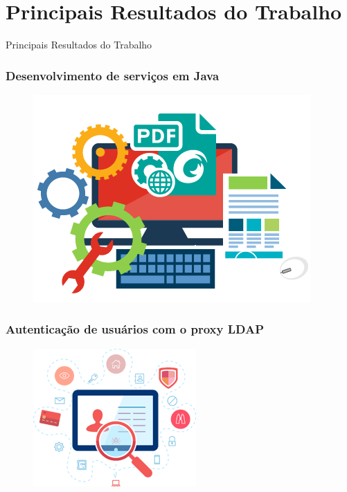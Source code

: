 \documentclass{beamer}
\begin{document}
\section{Principais Resultados do Trabalho}


\begin{frame}[c]{ }
\centering
  \huge{Principais Resultados do Trabalho}
\end{frame}



\begin{frame}
  \frametitle{Desenvolvimento de serviços em Java}

	\begin{figure}
	\centering
		\includegraphics[scale=0.4]{img/sdk.png}
	\end{figure}
  
\end{frame}


\begin{frame}
  \frametitle{Autenticação de usuários com o proxy LDAP}

	\begin{figure}
	\centering
		\includegraphics[scale=0.6]{img/ldap.png}
	\end{figure}
  
\end{frame}
\end{document}
